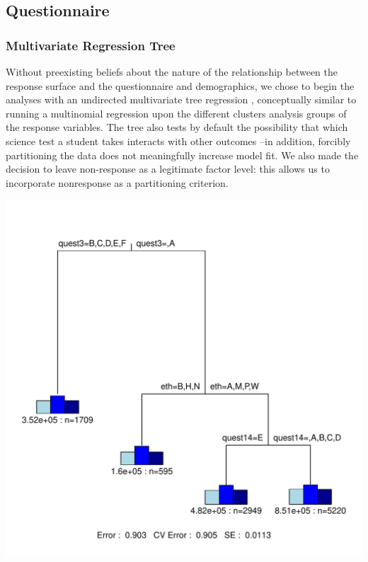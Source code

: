 \documentclass{article}\usepackage[]{graphicx}\usepackage[]{color}
\makeatletter
\def\maxwidth{ %
  \ifdim\Gin@nat@width>\linewidth
    \linewidth
  \else
    \Gin@nat@width
  \fi
}
\newenvironment{knitrout}{}{} %
\makeatother
\begin{document}
\subsection{Questionnaire}
\subsubsection{Multivariate Regression Tree}

Without preexisting beliefs about the nature of the relationship between the response surface and the questionnaire and demographics, we chose to begin the analyses with an undirected multivariate tree regression \cite{De'ath}, conceptually similar to running a multinomial regression upon the different clusters analysis groups of the response variables. The tree also tests by default the possibility that which science test a student takes interacts with other outcomes --in addition, forcibly partitioning the data does not meaningfully increase model fit. We also made the decision to leave non-response as a legitimate factor level: this allows us to incorporate nonresponse as a partitioning criterion.

\begin{knitrout}
\color{fgcolor}
\includegraphics[width=\maxwidth]{figure/unnamed-chunk-17} 

\end{knitrout}
\end{document}
